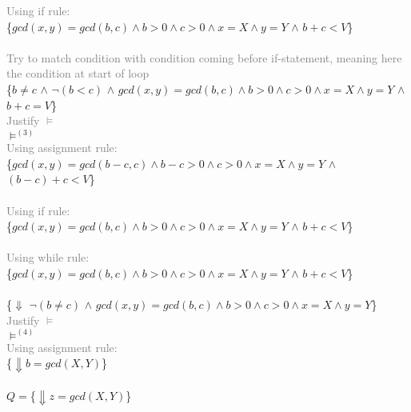 \documentclass{article}
\begin{document}
\begin{enumerate}
          \textcolor{gray}{Using if rule:} \\
          \{$gcd(x,y)=gcd(b,c) \land b >0 \land c > 0 \land x=X \land y=Y$ $\land$ \colorbox{teal!10}{$b+c < V$}\}
          \\
           \\
          \textcolor{gray}{Try to match condition with condition coming before if-statement, meaning here the condition at start of loop} \\
          \{\colorbox{magenta!10}{$b \neq c$} $\land$ \colorbox{NavyBlue!10}{$\lnot(b<c)$} $\land$ \colorbox{blue!10}{$gcd(x,y)=gcd(b,c) \land b > 0 \land c > 0 \land x=X \land y=Y$}
          $\land$ \colorbox{teal!10}{$b+c = V$}\}
          \\  \textcolor{gray}{Justify $\vDash$} \\
          $\vDash^{(3)}$ \\
          \textcolor{gray}{Using assignment rule:} \\
          \{$gcd(x,y)=gcd(b-c,c) \land b-c > 0 \land c > 0 \land x=X \land y=Y$ $\land$ \colorbox{teal!10}{$(b-c)+c < V$}\}
          \\
           \\
          \textcolor{gray}{Using if rule:} \\
          \{$gcd(x,y)=gcd(b,c) \land b >0 \land c > 0 \land x=X \land y=Y$ $\land$ \colorbox{teal!10}{$b+c < V$}\}
          \\
           \\
          \textcolor{gray}{Using while rule:} \\
          \{$gcd(x,y)=gcd(b,c) \land b >0 \land c > 0 \land x=X \land y=Y$ $\land$ \colorbox{teal!10}{$b+c < V$}\}
          \\
           \\
          \{$\Downarrow$ \colorbox{magenta!10}{$\lnot(b \neq c)$} $\land$ \colorbox{blue!10}{$gcd(x,y)=gcd(b,c) \land b >0 \land c > 0 \land x=X \land y=Y$}\}
          \\  \textcolor{gray}{Justify $\vDash$} \\
          $\vDash^{(4)}$ \\
          \textcolor{gray}{Using assignment rule:}\\
          \{$\Downarrow b=gcd(X,Y)$\}
          \\
           \\
          $Q=$\{$\Downarrow z=gcd(X,Y)$\}


\end{enumerate}
\end{document}
